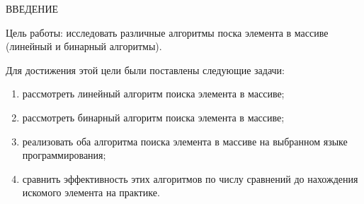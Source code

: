 \begin{center}
    \MakeUppercase{Введение}
\end{center}

Цель работы: исследовать различные алгоритмы поска элемента в массиве (линейный и бинарный алгоритмы).

\vspace{0.25cm}
Для достижения этой цели были поставлены следующие задачи:

\begin{enumerate}

\item рассмотреть линейный алгоритм поиска элемента в массиве;

\item рассмотреть бинарный алгоритм поиска элемента в массиве;

\item реализовать оба алгоритма поиска элемента в массиве на выбранном языке программирования;

\item сравнить эффективность этих алгоритмов по числу сравнений до нахождения искомого элемента на практике.

\end{enumerate}

\newpage